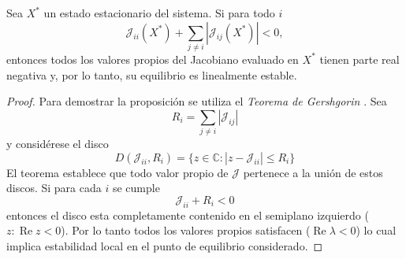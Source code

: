 \begin{proposición}\label{prop:DiagonalI}
	Sea $X^*$ un estado estacionario del sistema. Si para todo $i$
	$$\mathcal{J}_{ii}(X^*)+\sum_{j\neq i}|\mathcal{J}_{ij}(X^*)|<0,$$
	entonces todos los valores propios del Jacobiano evaluado en $X^*$ tienen parte real negativa y, por lo tanto, su equilibrio es linealmente estable.
\end{proposición}
\begin{proof}
	Para demostrar la proposición se utiliza el \textit{Teorema de Gershgorin} \cite{GershgorinTheorem}. Sea 
	$$R_i=\sum_{j\neq i}|\mathcal{J}_{ij}|$$
	y considérese el disco
	$$D(\mathcal{J}_{ii},R_i)=\{z\in\mathbb{C}:|z-\mathcal{J}_{ii}|\leq R_i\}$$
	El teorema establece que todo valor propio de $\mathcal{J}$ pertenece a la unión de estos discos. Si para cada $i$ se cumple 
	\begin{equation}\label{proof:CondicionGershgorin}
		\mathcal{J}_{ii}+R_i<0
	\end{equation}
	entonces el disco esta completamente contenido en el semiplano izquierdo ($z:\operatorname{Re}z<0$). Por lo tanto todos los valores propios satisfacen ($\operatorname{Re}\lambda<0$) lo cual implica estabilidad local en el punto de equilibrio considerado.	
\end{proof}

